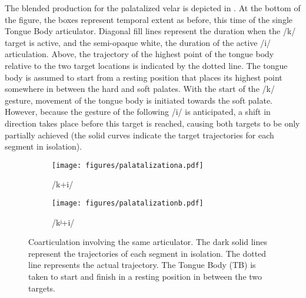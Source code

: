 The blended production for the palatalized velar is depicted in . 
At the bottom of the figure, the boxes represent
temporal extent as before, this time of the single Tongue Body articulator.
Diagonal fill lines represent the duration when the {/k/}
target is active, and the semi-opaque white, the duration of the active
{/i/} articulation. Above, the trajectory of the highest
point of the tongue body relative to the two target locations is indicated
by the dotted line. The tongue body is assumed to start from a resting
position that places its highest point somewhere in between the hard
and soft palates. With the start of the {/k/} gesture, movement
of the tongue body is initiated towards the soft palate. However,
because the gesture of the following {/i/} is anticipated,
a shift in direction takes place before this target is reached, causing
both targets to be only partially achieved (the solid curves indicate
the target trajectories for each segment in isolation). 

\begin{figure}[H]

\begin{subfigure}[t]{.60\textwidth}
        \texttt{[image: figures/palatalizationa.pdf]}
        \caption{\label{fig:/k+i}/k+i/}
    \end{subfigure}\hfill
    \begin{subfigure}[t]{.40\textwidth}
        \texttt{[image: figures/palatalizationb.pdf]}
        \caption{\label{fig:/k=0002B2+i/} {/kʲ+i/}}
    \end{subfigure}
    
    

\caption{Coarticulation involving the same articulator. The dark solid lines
represent the trajectories of each segment in isolation. The dotted
line represents the actual trajectory. The Tongue Body (TB) is taken
to start and finish in a resting position in between the two targets. }
\end{figure}

